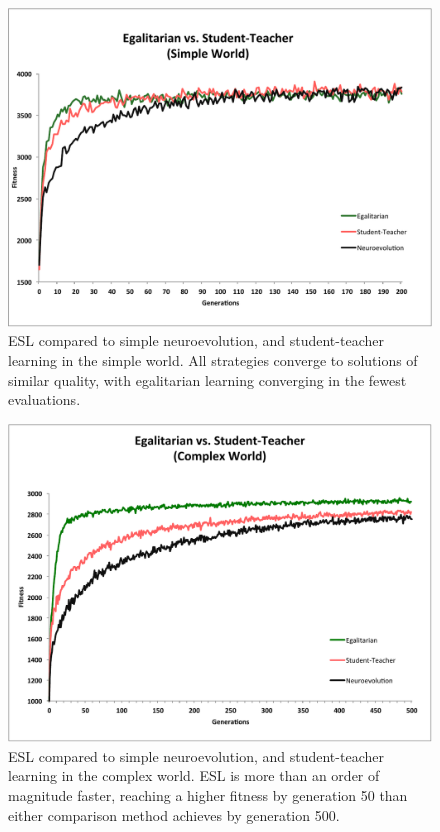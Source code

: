 \documentclass{sig-alternate}
\begin{document}
\begin{figure}
  \centering
    \includegraphics[scale=.41]{egalitarian_vs_student_teacher_simple.pdf}
  \caption{ESL compared to simple neuroevolution, and student-teacher learning in the simple world. All strategies converge to solutions of similar quality, with egalitarian learning converging in the fewest evaluations.}
  \label{fig:reward-studentteacher-simple}
\end{figure}

\begin{figure}
  \centering
    \includegraphics[scale=.41]{egalitarian_vs_student_teacher_complex.pdf}
  \caption{ESL compared to simple neuroevolution, and student-teacher learning in the complex world.  ESL is more than an order of magnitude faster, reaching a higher fitness by generation 50 than either comparison method achieves by generation 500.}
  \label{fig:reward-studentteacher-complex}
\end{figure}
\end{document}
